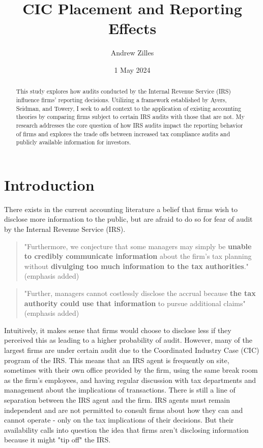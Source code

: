 \documentclass[12pt]{article}
\title{CIC Placement and Reporting Effects}
\author{Andrew Zilles}
\date{1 May 2024}
\begin{document}
\maketitle

\begin{abstract}
This study explores how audits conducted by the Internal Revenue Service (IRS) influence firms' reporting decisions. Utilizing a framework established by Ayers, Seidman, and Towery\citep{Ayers2019}, I seek to add context to the application of existing accounting theories by comparing firms subject to certain IRS audits with those that are not. My research addresses the core question of how IRS audits impact the reporting behavior of firms and explores the trade offs between increased tax compliance audits and publicly available information for investors.
\end{abstract}

\section{Introduction}
There exists in the current accounting literature a belief that firms wish to disclose more information to the public, but are afraid to do so for fear of audit by the Internal Revenue Service (IRS).

\begin{quote}
"Furthermore, we conjecture that some managers may simply be \textbf{unable to credibly communicate information} about the firm's tax planning without \textbf{divulging too much information to the tax authorities}." \citep{Balakrishnan2019} (emphasis added)
\end{quote}

\begin{quote}
"Further, managers cannot costlessly disclose the accrual because \textbf{the tax authority could use that information} to pursue additional claims" \citep{Dhaliwal2004} (emphasis added)
\end{quote} 

Intuitively, it makes sense that firms would choose to disclose less if they perceived this as leading to a higher probability of audit. However, many of the largest firms are under certain audit due to the Coordinated Industry Case (CIC) program of the IRS. This means that an IRS agent is frequently on site, sometimes with their own office provided by the firm, using the same break room as the firm's employees, and having regular discussion with tax departments and management about the implications of transactions. There is still a line of separation between the IRS agent and the firm. IRS agents must remain independent and are not permitted to consult firms about how they can and cannot operate - only on the tax implications of their decisions. But their availability calls into question the idea that firms aren't disclosing information because it might "tip off" the IRS.
\end{document}
